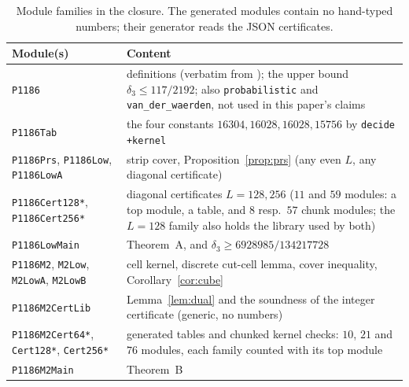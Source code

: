\documentclass[11pt]{amsart}
\theoremstyle{remark}
\newcommand{\lean}[1]{\texttt{#1}}
\begin{document}
\begin{table}[h]
\centering\small
\begin{tabular}{p{4.6cm}p{8.2cm}}
\toprule
Module(s) & Content\\
\midrule
\texttt{P1186} & definitions (verbatim from \cite{FC}); the upper bound $\delta_3\le117/2192$; also \lean{probabilistic} and \lean{van\_der\_waerden}, not used in this paper's claims\\
\texttt{P1186Tab} & the four constants $16304,16028,16028,15756$ by \texttt{decide +kernel}\\
\texttt{P1186Prs}, \texttt{P1186Low}, \texttt{P1186LowA} & strip cover, Proposition~\ref{prop:prs} (any even $L$, any diagonal certificate)\\
\texttt{P1186Cert128*}, \texttt{P1186Cert256*} & diagonal certificates $L=128,256$ ($11$ and $59$ modules: a top module, a table, and $8$ resp.\ $57$ chunk modules; the $L=128$ family also holds the library used by both)\\
\texttt{P1186LowMain} & Theorem~A, and $\delta_3\ge6928985/134217728$\\
\texttt{P1186M2}, \texttt{M2Low}, \texttt{M2LowA}, \texttt{M2LowB} & cell kernel, discrete cut-cell lemma, cover inequality, Corollary~\ref{cor:cube}\\
\texttt{P1186M2CertLib} & Lemma~\ref{lem:dual} and the soundness of the integer certificate (generic, no numbers)\\
\texttt{P1186M2Cert64*}, \texttt{Cert128*}, \texttt{Cert256*} & generated tables and chunked kernel checks: $10$, $21$ and $76$ modules, each family counted with its top module\\
\texttt{P1186M2Main} & Theorem~B\\
\bottomrule
\end{tabular}
\caption{Module families in the closure. The generated modules contain no hand-typed numbers; their generator reads the JSON certificates.}\label{tab:modules}
\end{table}
\end{document}

